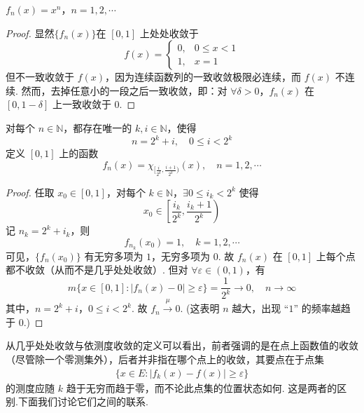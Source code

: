 \documentclass[../../main.tex]{subfiles}%
\begin{document}
\begin{example}[收敛但不一致收敛的函数]

$f_n(x)=x^n$，$n = 1,2,\cdots$ 
\end{example}
\begin{proof}

显然$\{f_n(x)\}$在 $[0,1]$ 上处处收敛于
\[
f(x)=
\begin{cases}
0, & 0\leqslant x<1 \\
1, & x = 1
\end{cases}
\]
但不一致收敛于 $f(x)$，因为连续函数列的一致收敛极限必连续，而 $f(x)$ 不连续. 然而，去掉任意小的一段之后一致收敛，即：对 $\forall\delta>0$，$f_n(x)$ 在 $[0,1 - \delta]$ 上一致收敛于 $0$.

\end{proof}

\begin{example}[依测度收敛但不几乎处处收敛的函数]

对每个 $n\in\mathbb{N}$，都存在唯一的 $k,i\in\mathbb{N}$，使得
\[
n = 2^k + i,\quad 0\leqslant i<2^k
\]
定义 $[0,1]$ 上的函数
\[
f_n(x)=\chi_{[\frac{i}{2^k},\frac{i + 1}{2^k})}(x),\quad n = 1,2,\cdots
\]
\end{example}
\begin{proof}

任取 $x_0\in[0,1]$，对每个 $k\in\mathbb{N}$，$\exists 0\leqslant i_k<2^k$ 使得
\[
x_0\in\left[\frac{i_k}{2^k},\frac{i_k + 1}{2^k}\right)
\]
记 $n_k = 2^k + i_k$，则
\[
f_{n_k}(x_0)=1,\quad k = 1,2,\cdots
\]
可见，$\{f_n(x_0)\}$ 有无穷多项为 $1$，无穷多项为 $0$. 故 $f_n(x)$ 在 $[0,1]$ 上每个点都不收敛（从而不是几乎处处收敛）. 但对 $\forall\varepsilon\in(0,1)$，有
\[
m\{x\in[0,1]:\vert f_n(x)-0\vert\geqslant\varepsilon\}=\frac{1}{2^k}\to 0,\quad n\to\infty
\]
其中，$n = 2^k + i$，$0\leqslant i<2^k$. 故 $f_n\stackrel{\mu}{\longrightarrow}0$. (这表明 $n$ 越大，出现 “$1$” 的频率越趋于 $0$.) 

\end{proof}

\vspace{0.4cm}

从几乎处处收敛与依测度收敛的定义可以看出，前者强调的是在点上函数值的收敛（尽管除一个零测集外），后者并非指在哪个点上的收敛，其要点在于点集
\begin{align*}
\{x\in E:\vert f_k(x)-f(x)\vert\geqslant\varepsilon\}
\end{align*}
的测度应随 $k$ 趋于无穷而趋于零，而不论此点集的位置状态如何. 这是两者的区别.下面我们讨论它们之间的联系.
\end{document}
